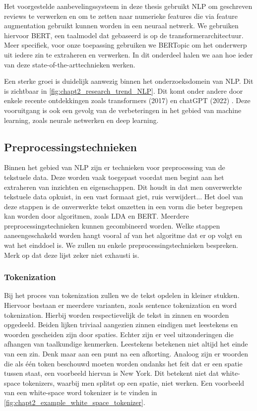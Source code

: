 Het voorgestelde aanbevelingssysteem in deze thesis gebruikt NLP om geschreven reviews te verwerken en om te zetten naar numerieke features die via feature augmentation gebruikt kunnen worden in een neuraal netwerk. We gebruiken hiervoor BERT, een taalmodel dat gebaseerd is op de transformerarchitectuur. Meer specifiek, voor onze toepassing gebruiken we BERTopic om het onderwerp uit iedere zin te extraheren en verwerken. In dit onderdeel halen we aan hoe ieder van deze state-of-the-arttechnieken werken.


Een sterke groei is duidelijk aanwezig binnen het onderzoeksdomein van NLP. Dit is zichtbaar in \autoref{fig:chapt2_research_trend_NLP}. Dit komt onder andere door enkele recente ontdekkingen zoals transformers (2017) \cite{attention_is_all_you_need} en chatGPT (2022) \cite{openai_chatgpt}. Deze vooruitgang is ook een gevolg van de verbeteringen in het gebied van machine learning, zoals neurale netwerken en deep learning.

\subsection{Preprocessingstechnieken}
Binnen het gebied van NLP zijn er technieken voor preprocessing van de tekstuele data. Deze worden vaak toegepast voordat men begint aan het extraheren van inzichten en eigenschappen. Dit houdt in dat men
onverwerkte tekstuele data opkuist, in een vast formaat giet, ruis verwijdert... Het doel van deze stappen is de onverwerkte tekst omzetten in een vorm die beter begrepen kan worden door algoritmen, zoals LDA en BERT. Meerdere preprocessingstechnieken kunnen gecombineerd worden. Welke stappen aaneengeschakeld worden hangt vooral af van het algoritme dat er op volgt en wat het einddoel is. We zullen nu enkele preprocessingstechnieken bespreken. Merk op dat deze lijst zeker niet exhausti is.

\subsubsection{Tokenization}
\label{sub:chapt2_tokenization}
Bij het proces van tokenization \cite{tokenization_basics} zullen we de tekst opdelen in kleiner stukken. Hiervoor bestaan er meerdere varianten, zoals sentence tokenization en word tokenization.
Hierbij worden respectievelijk de tekst in zinnen en woorden opgedeeld. Beiden lijken triviaal aangezien zinnen eindigen met leestekens en woorden gescheiden zijn door spaties. Echter zijn er veel uitzonderingen die afhangen van taalkundige kenmerken. Leestekens betekenen niet altijd het einde van een zin. Denk maar aan een punt na een afkorting. Analoog zijn er woorden die als één token beschouwd moeten worden ondanks het feit dat er een spatie tussen staat, een voorbeeld hiervan is New York. Dit betekent niet dat white-space tokenizers, waarbij men splitst op een spatie, niet werken. Een voorbeeld van een white-space word tokenizer is te vinden in \autoref{fig:chapt2_example_white_space_tokenizer}.

